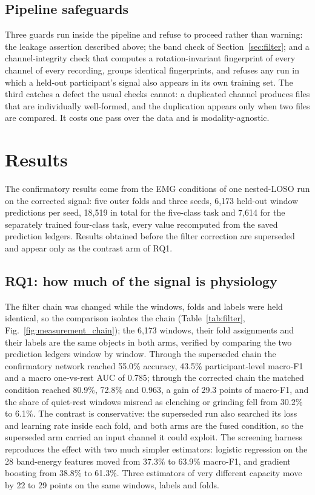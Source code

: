 \documentclass[pdflatex,sn-nature,iicol]{sn-jnl}
\begin{document}
\subsection{Pipeline safeguards}
\label{sec:safeguards}

Three guards run inside the pipeline and refuse to proceed rather than warning: the leakage assertion described above; the band check of Section~\ref{sec:filter}; and a channel-integrity check that computes a rotation-invariant fingerprint of every channel of every recording, groups identical fingerprints, and refuses any run in which a held-out participant's signal also appears in its own training set. The third catches a defect the usual checks cannot: a duplicated channel produces files that are individually well-formed, and the duplication appears only when two files are compared. It costs one pass over the data and is modality-agnostic.

\section{Results}

The confirmatory results come from the EMG conditions of one nested-LOSO run on the corrected signal: five outer folds and three seeds, 6,173 held-out window predictions per seed, 18,519 in total for the five-class task and 7,614 for the separately trained four-class task, every value recomputed from the saved prediction ledgers. Results obtained before the filter correction are superseded and appear only as the contrast arm of RQ1.

\subsection{RQ1: how much of the signal is physiology}
\label{sec:rq1}

The filter chain was changed while the windows, folds and labels were held identical, so the comparison isolates the chain (Table~\ref{tab:filter}, Fig.~\ref{fig:measurement_chain}); the 6,173 windows, their fold assignments and their labels are the same objects in both arms, verified by comparing the two prediction ledgers window by window. Through the superseded chain the confirmatory network reached 55.0\% accuracy, 43.5\% participant-level macro-F1 and a macro one-vs-rest AUC of 0.785; through the corrected chain the matched condition reached 80.9\%, 72.8\% and 0.963, a gain of 29.3 points of macro-F1, and the share of quiet-rest windows misread as clenching or grinding fell from 30.2\% to 6.1\%. The contrast is conservative: the superseded run also searched its loss and learning rate inside each fold, and both arms are the fused condition, so the superseded arm carried an input channel it could exploit. The screening harness reproduces the effect with two much simpler estimators: logistic regression on the 28 band-energy features moved from 37.3\% to 63.9\% macro-F1, and gradient boosting from 38.8\% to 61.3\%. Three estimators of very different capacity move by 22 to 29 points on the same windows, labels and folds.
\end{document}
